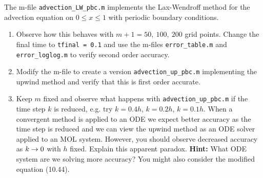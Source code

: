 

The m-file \verb+advection_LW_pbc.m+ implements the Lax-Wendroff method for
the advection equation on $0\leq x\leq 1$ with periodic boundary conditions.

\begin{enumerate}
\item Observe how this behaves with $m+1 = 50,~100,~200$ grid points.
Change the final time to {\tt tfinal = 0.1} and use
the m-files \verb+error_table.m+ and \verb+error_loglog.m+ to verify second
order accuracy.  

\item Modify the m-file to create a version \verb+advection_up_pbc.m+
implementing the upwind method and verify that this is first order accurate.

\item Keep $m$ fixed and observe what happens with \verb+advection_up_pbc.m+
if the time step $k$ is reduced, e.g. try $k = 0.4h$, $k= 0.2h$, $k=0.1h$.
When a convergent method is applied to
an ODE we expect better accuracy as the time step is reduced and we can
view the upwind method as an ODE solver applied to an MOL system.  However,
you should observe decreased accuracy as $k\rightarrow 0$ with $h$ fixed.  Explain
this apparent paradox.  
{\bf Hint:} What ODE system are we solving more accuracy?  You might also
consider the modified equation (10.44).

\end{enumerate}

